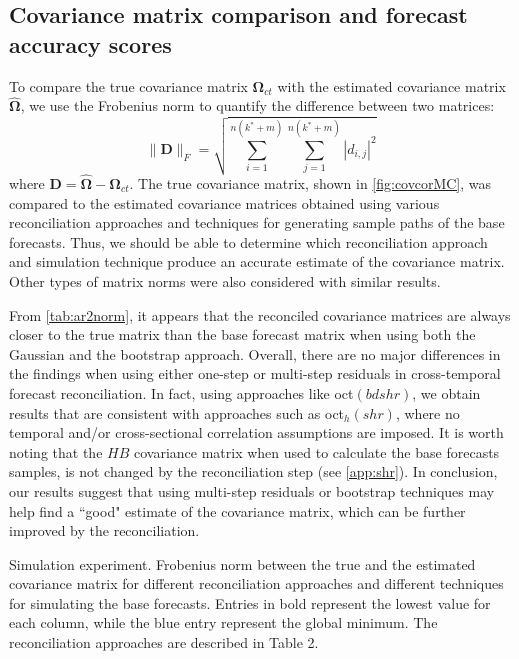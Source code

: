 \documentclass[a4paper,11pt]{article}
\newcommand{\Dvet}{\bm{D}}
\newcommand{\Omegavet}{\bm{\Omega}}
\theoremstyle{definition}
\begin{document}
\subsection{Covariance matrix comparison and forecast accuracy scores}\label{ssec:acc_scores}
\setcounter{table}{0} 
\setcounter{figure}{0} 

To compare the true covariance matrix $\Omegavet_{ct}$ with the estimated covariance matrix $\widehat{\Omegavet}$, we use the Frobenius norm to quantify the difference between two matrices: 
$$\lVert \Dvet \rVert_F = \displaystyle\sqrt{\sum_{i = 1}^{n(k^\ast + m)}\sum_{j = 1}^{n(k^\ast + m)}|d_{i,j}|^2}$$ where $\Dvet = \widehat{\Omegavet} - \Omegavet_{ct}$. The true covariance matrix, shown in \autoref{fig:covcorMC}, was compared to the estimated covariance matrices obtained using various reconciliation approaches and techniques for generating sample paths of the base forecasts. Thus, we should be able to determine which reconciliation approach and simulation technique produce an accurate estimate of the covariance matrix. Other types of matrix norms were also considered with similar results.

From \autoref{tab:ar2norm}, it appears that the reconciled covariance matrices are always closer to the true matrix than the base forecast matrix when using both the Gaussian and the bootstrap  approach. Overall, there are no major differences in the findings when using either one-step or multi-step residuals in cross-temporal forecast reconciliation. In fact, using approaches like oct$(bdshr)$, we obtain results that are consistent with approaches such as oct$_h(shr)$, where no temporal and/or cross-sectional correlation assumptions are imposed. It is worth noting that the $HB$ covariance matrix when used to calculate the base forecasts samples, is not changed by the reconciliation step (see \autoref{app:shr}). In conclusion, our results suggest that using multi-step residuals or bootstrap techniques may help find a “good" estimate of the covariance matrix, which can be further improved by the reconciliation.

\begin{table}[!t]
	\centering
	\begingroup
	\fontsize{9}{11}\selectfont
	
	\endgroup
	\caption{Simulation experiment. Frobenius norm between the true and the estimated covariance matrix for different reconciliation approaches and different techniques for simulating the base forecasts. Entries in bold represent the lowest value for each column, while the blue entry represent the global minimum. The reconciliation approaches are described in Table 2.}
	\label{tab:ar2norm}
\end{table}
\end{document}
